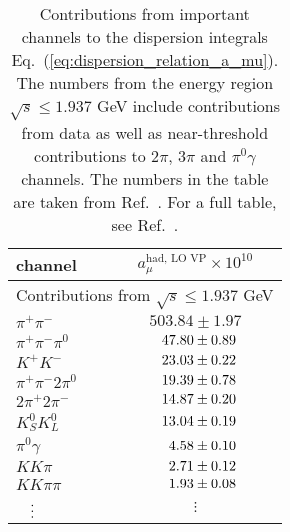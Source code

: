 \begin{table} 
\caption{Contributions from important channels to the 
dispersion integrals Eq.~(\ref{eq:dispersion_relation_a_mu}).
The numbers from the energy region $\sqrt{s} \leq 1.937$ GeV
include contributions from data as well as near-threshold
contributions to $2\pi$, $3\pi$ and $\pi^0\gamma$ channels.
The numbers in the table are taken from Ref.~\cite{KNT18}.
For a full table, see Ref.~\cite{KNT18}.}
%
\label{table:contributions}
%
\begin{center} \begin{tabular}{|l|c|}
\hline
channel        & $a_\mu^{\text{had, LO VP}} \times 10^{10}$ \\
\hline
\multicolumn{2}{|c|}{Contributions from $\sqrt{s} \leq 1.937$ GeV} \\
\hline
$\pi^+\pi^-$   & $503.84 \pm 1.97$     \\ %
$\pi^+\pi^-\pi^0$
               & $\hpz47.80 \pm 0.89$  \\ %
$K^+ K^-$      & $\hpz23.03 \pm 0.22$  \\ %
$\pi^+ \pi^- 2\pi^0$
               & $\hpz19.39 \pm 0.78$  \\ %
$2\pi^+ 2\pi^-$& $\hpz14.87 \pm 0.20$  \\ %
$K_S^0 K_L^0$  & $\hpz13.04 \pm 0.19$  \\ %
$\pi^0 \gamma$ & $\hpzz4.58 \pm 0.10$  \\ %
$KK\pi$        & $\hpzz2.71 \pm 0.12$  \\ %
$KK\pi\pi$     & $\hpzz1.93 \pm 0.08$  \\ %
$\hpzz\vdots$  &  $\vdots$             \\ %

\end{tabular}
\end{center}
\end{table}

